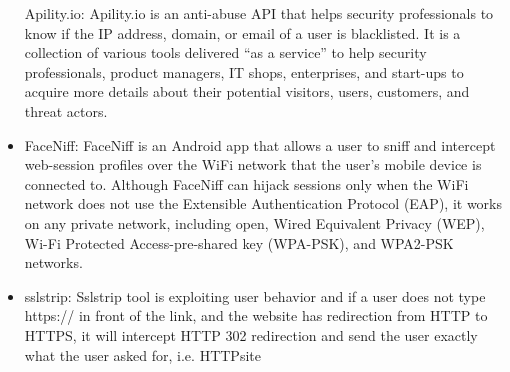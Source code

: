 \begin{itemize}
    Apility.io: Apility.io is an anti-abuse API that helps security professionals to know if the IP address, domain, or email of a user is blacklisted. It is a collection of various tools delivered “as a service” to help security professionals, product managers, IT shops, enterprises, and start-ups to acquire more details about their potential visitors, users, customers, and threat actors.
    \item FaceNiff: FaceNiff is an Android app that allows a user to sniff and intercept web-session profiles over the WiFi network that the user's mobile device is connected to. Although FaceNiff can hijack sessions only when the WiFi network does not use the Extensible Authentication Protocol (EAP), it works on any private network, including open, Wired Equivalent Privacy (WEP), Wi-Fi Protected Access-pre-shared key (WPA-PSK), and WPA2-PSK networks.
    \item sslstrip: Sslstrip tool is exploiting user behavior and if a user does not type https:// in front of the link, and the website has redirection from HTTP to HTTPS, it will intercept HTTP 302 redirection and send the user exactly what the user asked for, i.e. HTTPsite
\end{itemize}

